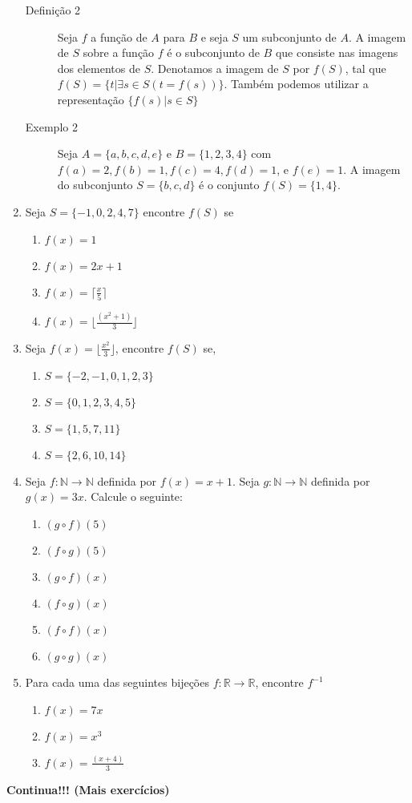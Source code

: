 \begin{enumerate}
	\begin{description}
		\item[Definição 2] Seja $f$ a função de $A$ para $B$ e seja $S$ um subconjunto de $A$. A imagem de $S$ sobre a função $f$ é o
		subconjunto de $B$ que consiste nas imagens dos elementos de $S$. Denotamos a imagem de $S$ por $f(S)$, tal que
		$f(S) = \{t | \exists s \in S(t = f(s))\}$. Também podemos utilizar a representação $\{f(s) | s \in S\}$
		\item[Exemplo 2] Seja $A = \{a,b,c,d,e\}$ e $B = \{1,2,3,4\}$ com $f(a)=2, f(b)=1, f(c)=4, f(d)=1$, e $f(e)=1$. A imagem
		do subconjunto $S = \{b,c,d\}$ é o conjunto $f(S) = \{1, 4\}$.
	\end{description}

	\item Seja $S = \{-1,0,2,4,7\}$ encontre $f(S)$ se
	\begin{enumerate}
	  	\item $f(x)=1$ \item $f(x)=2x + 1$ \item $f(x)=\lceil \frac{x}{5} \rceil$ \item $f(x) = \lfloor \frac{(x^2 + 1)}{3} \rfloor$  
	\end{enumerate}

	\item Seja $f(x) = \lfloor \frac{x^2}{3} \rfloor$, encontre $f(S)$ se,
	\begin{enumerate}
		\item $S = \{-2,-1,0,1,2,3\}$ \item $S=\{0,1,2,3,4,5\}$ \item $S=\{1,5,7,11\}$ \item $S=\{2,6,10,14\}$ 
	\end{enumerate}
	
	\item Seja $f: \mathbb{N} \to \mathbb{N}$ definida por $f(x) = x + 1$. Seja $g: \mathbb{N} \to \mathbb{N}$ definida por $g(x) = 3x$.
	Calcule o seguinte:
	\begin{enumerate}
	  	\item $(g \circ f)(5)$ \item $(f \circ g)(5)$ \item $(g \circ f)(x)$ \item $(f \circ g)(x)$ \item $(f \circ f)(x)$
	  	\item $(g \circ g)(x)$
	\end{enumerate}
	
	\item Para cada uma das seguintes bijeções $f: \mathbb{R} \to \mathbb{R}$, encontre $f^{-1}$
	\begin{enumerate}
	  	\item $f(x)=7x$ \item $f(x) = x^3$ \item $f(x) = \frac{(x + 4)}{3}$
	\end{enumerate}
\end{enumerate}

\vspace*{2em}
\begin{center}\textbf{Continua!!! (Mais exercícios)}\end{center}